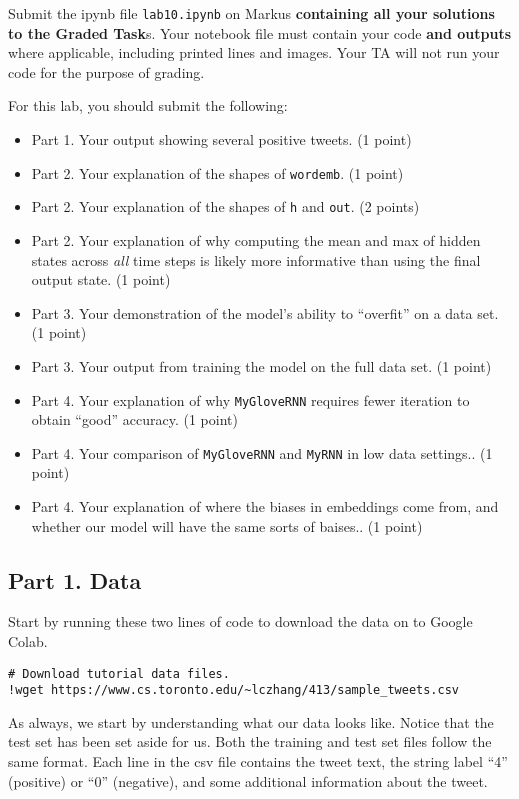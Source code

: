 \documentclass[
  letterpaper,
  DIV=11,
  numbers=noendperiod]{scrartcl}
\providecommand{\tightlist}{%
  \setlength{\itemsep}{0pt}\setlength{\parskip}{0pt}}
\begin{document}
Submit the ipynb file \texttt{lab10.ipynb} on Markus \textbf{containing
all your solutions to the Graded Task}s. Your notebook file must contain
your code \textbf{and outputs} where applicable, including printed lines
and images. Your TA will not run your code for the purpose of grading.

For this lab, you should submit the following:

\begin{itemize}
\tightlist
\item
  Part 1. Your output showing several positive tweets. (1 point)
\item
  Part 2. Your explanation of the shapes of \texttt{wordemb}. (1 point)
\item
  Part 2. Your explanation of the shapes of \texttt{h} and \texttt{out}.
  (2 points)
\item
  Part 2. Your explanation of why computing the mean and max of hidden
  states across \emph{all} time steps is likely more informative than
  using the final output state. (1 point)
\item
  Part 3. Your demonstration of the model's ability to ``overfit'' on a
  data set. (1 point)
\item
  Part 3. Your output from training the model on the full data set. (1
  point)
\item
  Part 4. Your explanation of why \texttt{MyGloveRNN} requires fewer
  iteration to obtain ``good'' accuracy. (1 point)
\item
  Part 4. Your comparison of \texttt{MyGloveRNN} and \texttt{MyRNN} in
  low data settings.. (1 point)
\item
  Part 4. Your explanation of where the biases in embeddings come from,
  and whether our model will have the same sorts of baises.. (1 point)
\end{itemize}

\subsection{Part 1. Data}\label{part-1.-data}

Start by running these two lines of code to download the data on to
Google Colab.

\begin{verbatim}
# Download tutorial data files.
!wget https://www.cs.toronto.edu/~lczhang/413/sample_tweets.csv
\end{verbatim}

As always, we start by understanding what our data looks like. Notice
that the test set has been set aside for us. Both the training and test
set files follow the same format. Each line in the csv file contains the
tweet text, the string label ``4'' (positive) or ``0'' (negative), and
some additional information about the tweet.
\end{document}
